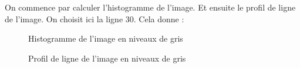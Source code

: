 \documentclass[french,a4paper,10pt]{article}
\begin{document}
    On commence par calculer l'histogramme de l'image.
    Et ensuite le profil de ligne de l'image.
    On choisit ici la ligne 30.
    Cela donne :
    \begin{figure}[!htb]
        \begin{minipage}{0.48\textwidth}
            \centering
            \caption{Histogramme de l'image en niveaux de gris}\label{Fig:histo-peppers-grey}
        \end{minipage}\hfill
        \begin{minipage}{0.48\textwidth}
            \centering
            \caption{Profil de ligne de l'image en niveaux de gris}\label{Fig:prof-peppers-grey}
        \end{minipage}
    \end{figure}
\end{document}
